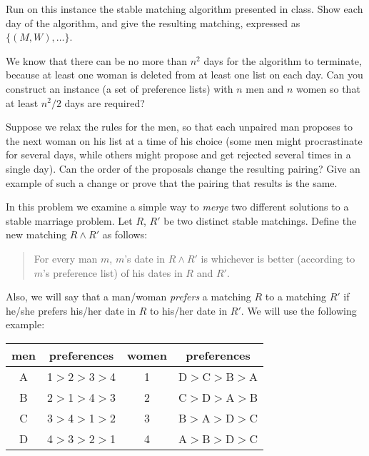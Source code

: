 \begin{Parts}
\Part  Run on this instance the stable matching algorithm presented in class. Show each day of the algorithm, and give the resulting matching, expressed as $\{(M,W),\ldots\}$.

\Part  We know that there can be no more than $n^2$ days for the algorithm to terminate, because at least one woman is deleted from at least one list on each day.  Can you construct an instance (a set of preference lists) with $n$ men and $n$ women so that at least $n^2/2$ days are required?

\Part Suppose we relax the rules for the men, so that each
unpaired man proposes to the next woman on his list at a 
time of his choice (some men might procrastinate for several
days, while others might propose and get rejected several times
in a single day). Can the order of the proposals change 
the resulting pairing? Give an example of such a change or 
prove that the pairing that results is the same.

\end{Parts}



In this problem we examine a simple way to {\em merge} two different
solutions to a stable marriage problem. 
Let $R$, $R'$ be two distinct stable matchings.  Define the
new matching $R \land R'$ as follows: 
\begin{quote}
For every man $m$, $m$'s date in $R \land R'$ is whichever is better
(according to $m$'s preference list) of his dates in $R$ and $R'$.
\end{quote}
Also, we will say that a man/woman \textit{prefers} a matching $R$
to a matching $R'$ if he/she prefers his/her date in $R$
to his/her date in $R'$. We will use the following example:

\begin{center}
\begin{tabular}{|c|c||c|c|}\hline
men&preferences& women & preferences \\
\hline
A& 1$>$2$>$3$>$4& 1 & D$>$C$>$B$>$A \\
\hline
B&2$>$1$>$4$>$3 & 2 & C$>$D$>$A$>$B  \\
\hline
C&3$>$4$>$1$>$2 & 3 & B$>$A$>$D$>$C  \\
\hline
D&4$>$3$>$2$>$1 & 4 & A$>$B$>$D$>$C  \\
\hline
\end{tabular}
\end{center}

